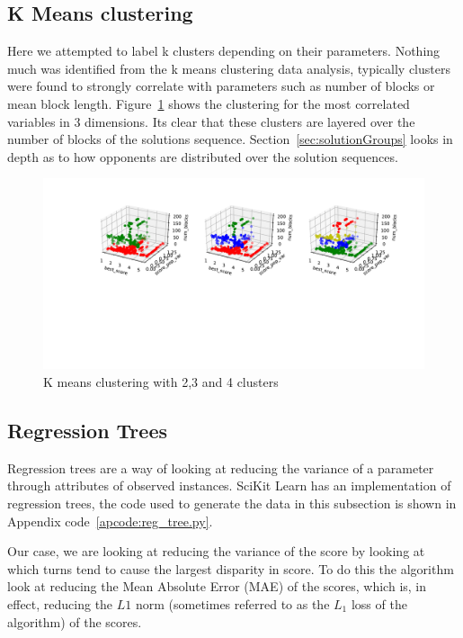 \subsection{K Means clustering~\cite{bora2014effect}}\label{ssec:k_means}
Here we attempted to label k clusters depending on their parameters.
Nothing much was identified from the k means clustering data analysis, typically clusters were found to strongly correlate with parameters such as number of blocks or mean block length.
Figure~\ref{fig:k_means} shows the clustering for the most correlated variables in 3 dimensions.
Its clear that these clusters are layered over the number of blocks of the solutions sequence.
Section~\ref{sec:solutionGroups} looks in depth as to how opponents are distributed over the solution sequences. 

\begin{figure}[ht]
    \includegraphics[width=1.0\textwidth, center]{./img/descriptive/k_means.pdf}
    \caption{K means clustering with 2,3 and 4 clusters}\label{fig:k_means}
\end{figure}

\subsection{Regression Trees}
Regression trees are a way of looking at reducing the variance of a parameter through attributes of observed instances. 
SciKit Learn has an implementation of regression trees, the code used to generate the data in this subsection is shown in Appendix code~\ref{apcode:reg_tree.py}.

Our case, we are looking at reducing the variance of the score by looking at which turns tend to cause the largest disparity in score.
To do this the algorithm look at reducing the Mean Absolute Error (MAE) of the scores, which is, in effect, reducing the $L1$ norm (sometimes referred to as the $L_1$ loss of the algorithm) of the scores.

